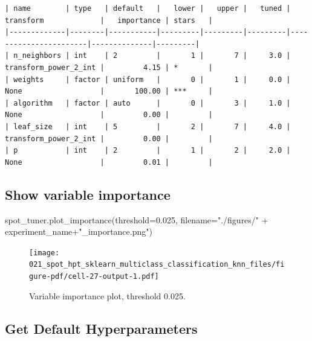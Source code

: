 \documentclass[
  letterpaper,
  DIV=11,
  numbers=noendperiod]{scrreprt}
\newenvironment{Shaded}{\begin{snugshade}}{\end{snugshade}}
\newcommand{\FloatTok}[1]{\textcolor[rgb]{0.68,0.00,0.00}{#1}}
\newcommand{\NormalTok}[1]{\textcolor[rgb]{0.00,0.23,0.31}{#1}}
\newcommand{\OperatorTok}[1]{\textcolor[rgb]{0.37,0.37,0.37}{#1}}
\newcommand{\StringTok}[1]{\textcolor[rgb]{0.13,0.47,0.30}{#1}}
\begin{document}
\begin{verbatim}
| name        | type   | default   |   lower |   upper |   tuned | transform             |   importance | stars   |
|-------------|--------|-----------|---------|---------|---------|-----------------------|--------------|---------|
| n_neighbors | int    | 2         |       1 |       7 |     3.0 | transform_power_2_int |         4.15 | *       |
| weights     | factor | uniform   |       0 |       1 |     0.0 | None                  |       100.00 | ***     |
| algorithm   | factor | auto      |       0 |       3 |     1.0 | None                  |         0.00 |         |
| leaf_size   | int    | 5         |       2 |       7 |     4.0 | transform_power_2_int |         0.00 |         |
| p           | int    | 2         |       1 |       2 |     2.0 | None                  |         0.01 |         |
\end{verbatim}

\hypertarget{show-variable-importance-4}{%
\subsection{Show variable importance}\label{show-variable-importance-4}}

\begin{Shaded}
\begin{Highlighting}[]
\NormalTok{spot\_tuner.plot\_importance(threshold}\OperatorTok{=}\FloatTok{0.025}\NormalTok{, filename}\OperatorTok{=}\StringTok{"./figures/"} \OperatorTok{+}\NormalTok{ experiment\_name}\OperatorTok{+}\StringTok{"\_importance.png"}\NormalTok{)}
\end{Highlighting}
\end{Shaded}

\begin{figure}[H]

{\centering \texttt{[image: 021\_spot\_hpt\_sklearn\_multiclass\_classification\_knn\_files/figure-pdf/cell-27-output-1.pdf]}

}

\caption{Variable importance plot, threshold 0.025.}

\end{figure}

\hypertarget{get-default-hyperparameters-4}{%
\subsection{Get Default
Hyperparameters}\label{get-default-hyperparameters-4}}
\end{document}
